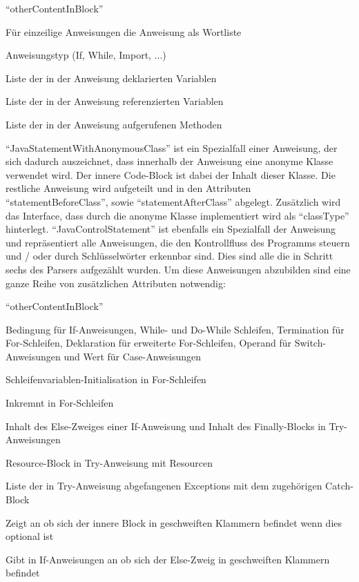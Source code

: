 \documentclass[gb,ngerman]{stthesis}
\begin{document}
				\begin{labeling} {"`otherContentInBlock"'}
					\item ["`statementText"'] Für einzeilige Anweisungen die Anweisung als Wortliste
					\item ["`type"'] Anweisungstyp (If, While, Import, ...) 
					\item ["`declaredVariables"'] Liste der in der Anweisung deklarierten Variablen 
					\item ["`referencedVariables"'] Liste der in der Anweisung referenzierten Variablen
					\item ["`calledMethods"'] Liste der in der Anweisung aufgerufenen Methoden
				\end{labeling}
				"`JavaStatementWithAnonymousClass"' ist ein Spezialfall einer Anweisung, der sich dadurch auszeichnet, dass innerhalb der Anweisung eine anonyme Klasse verwendet wird. Der innere Code-Block ist dabei der Inhalt dieser Klasse. Die restliche Anweisung wird aufgeteilt und in den Attributen "`statementBeforeClass"', sowie "`statementAfterClass"' abgelegt. Zusätzlich wird das Interface, dass durch die anonyme Klasse implementiert wird als "`classType"' hinterlegt. \newline \newline
				"`JavaControlStatement"' ist ebenfalls ein Spezialfall der Anweisung und repräsentiert alle Anweisungen, die den Kontrollfluss des Programms steuern und / oder durch Schlüsselwörter erkennbar sind. Dies sind alle die in Schritt sechs des Parsers aufgezählt wurden. Um diese Anweisungen abzubilden sind eine ganze Reihe von zusätzlichen Attributen notwendig:
				\begin{labeling} {"`otherContentInBlock"'}
					\item ["`condition"'] Bedingung für If-Anweisungen, While- und Do-While Schleifen, Termination für For-Schleifen, Deklaration für erweiterte For-Schleifen, Operand für Switch-Anweisungen und Wert für Case-Anweisungen
					\item ["`initialization"'] Schleifenvariablen-Initialisation in For-Schleifen
					\item ["`increment"'] Inkremnt in For-Schleifen
					\item ["`otherContent"'] Inhalt des Else-Zweiges einer If-Anweisung und Inhalt des Finally-Blocks in Try-Anweisungen
					\item ["`resources"'] Resource-Block in Try-Anweisung mit Resourcen
					\item ["`catchedExceptions"'] Liste der in Try-Anweisung abgefangenen Exceptions mit dem zugehörigen Catch-Block
					\item ["`contentInBlock"'] Zeigt an ob sich der innere Block in geschweiften Klammern befindet wenn dies optional ist
					\item ["`otherContentInBlock"'] Gibt in If-Anweisungen an ob sich der Else-Zweig in geschweiften Klammern befindet
				\end{labeling}
\end{document}
